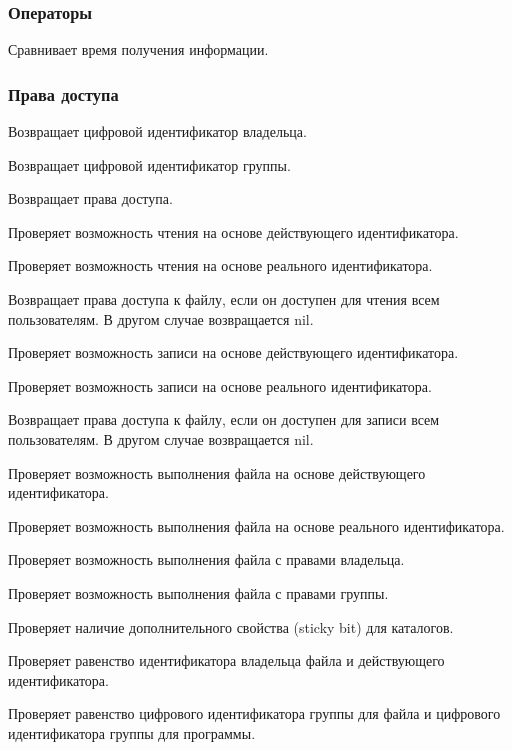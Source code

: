 \subsubsection*{Операторы}

\begin{methodlist}
  Сравнивает время получения информации.
\end{methodlist}

\subsubsection*{Права доступа}

\begin{methodlist}
  Возвращает цифровой идентификатор владельца. 
 
  Возвращает цифровой идентификатор группы. 

  Возвращает права доступа. 

  Проверяет возможность чтения на основе действующего идентификатора. 

  Проверяет возможность чтения на основе реального идентификатора.

  Возвращает права доступа к файлу, если он доступен для чтения всем пользователям. В другом случае возвращается nil. 

  Проверяет возможность записи на основе действующего идентификатора. 

  Проверяет возможность записи на основе реального идентификатора. 

  Возвращает права доступа к файлу, если он доступен для записи всем пользователям. В другом случае возвращается nil. 

  Проверяет возможность выполнения файла на основе действующего идентификатора.

  Проверяет возможность выполнения файла на основе реального идентификатора.

  Проверяет возможность выполнения файла с правами владельца. 

  Проверяет возможность выполнения файла с правами группы. 

  Проверяет наличие дополнительного свойства (sticky bit) для каталогов. 

  Проверяет равенство идентификатора владельца файла и действующего идентификатора. 

  Проверяет равенство цифрового идентификатора группы для файла и цифрового идентификатора группы для программы.
\end{methodlist}

